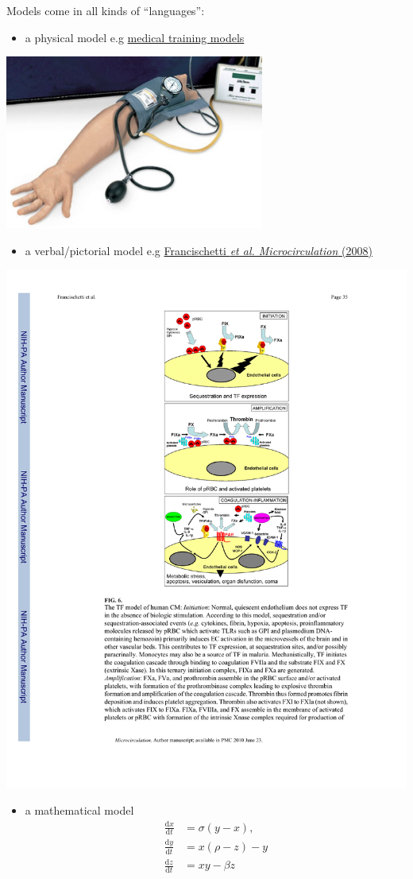 \documentclass[]{book}
\providecommand{\tightlist}{%
  \setlength{\itemsep}{0pt}\setlength{\parskip}{0pt}}
\theoremstyle{definition}
\theoremstyle{definition}
\theoremstyle{definition}
\theoremstyle{remark}
\begin{document}
Models come in all kinds of ``languages'':

\begin{itemize}
\tightlist
\item
  a physical model e.g
  \href{https://www.anatomystuff.co.uk/clinical-skills-training-models.html}{medical
  training models}
\end{itemize}

\begin{center}\includegraphics[width=0.45\linewidth]{_img/01-medical} \end{center}

\begin{itemize}
\tightlist
\item
  a verbal/pictorial model e.g
  \href{https://onlinelibrary.wiley.com/doi/pdf/10.1080/10739680701451516}{Francischetti
  \emph{et al. Microcirculation} (2008)}
\end{itemize}

\begin{center}\includegraphics[width=0.5\linewidth]{_img/01-biological} \end{center}

\begin{itemize}
\tightlist
\item
  a mathematical model \[
  \begin{aligned}
  {\frac {\mathrm {d} x}{\mathrm {d} t}}& = \sigma (y-x),\\
  {\frac {\mathrm {d} y}{\mathrm {d} t}}& = x(\rho -z)-y\\
  {\frac {\mathrm {d} z}{\mathrm {d} t}}& = xy-\beta z
  \end{aligned}
  \]
\end{itemize}
\end{document}
